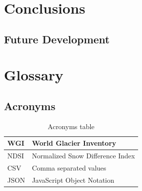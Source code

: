 \documentclass[11pt, a4paper]{report}
\begin{document}
	\chapter{Conclusions}
	\section{Future Development}
	\label{seq:future_development}
		
	\chapter{Glossary}
	
	
	\section{Acronyms}
	
		\begin{table} [H]
		\centering
		\begin{tabular} {|  l | L{10cm} |}
			\hline
			WGI & World Glacier Inventory \\ [0.2ex]
			\hline
			NDSI & Normalized Snow Difference Index \\ [0.2ex]
			\hline
			\hline
			CSV & Comma separated values \\ [0.2ex]
			\hline
			\hline
			JSON & JavaScript Object Notation \\ [0.2ex]
			\hline
		\end{tabular}
		\caption{Acronyms table }
		\label{table:acron}
	\end{table}
	
\end{document}
